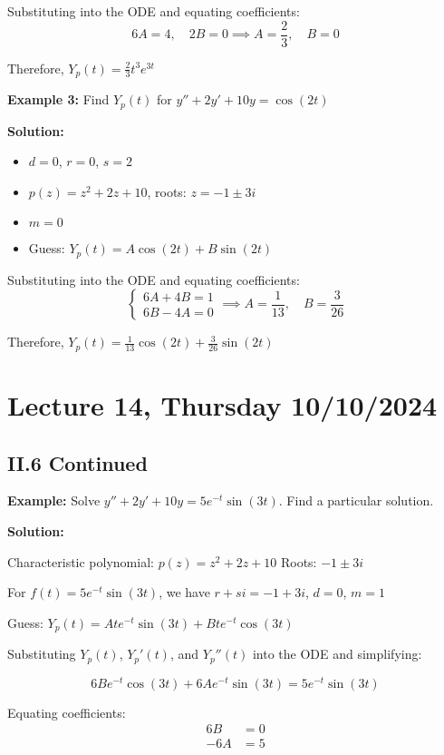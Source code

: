 \documentclass{article}
\begin{document}
Substituting into the ODE and equating coefficients:
\[
6A = 4, \quad 2B = 0 \implies A = \frac{2}{3}, \quad B = 0
\]

Therefore, $Y_p(t) = \frac{2}{3}t^3e^{3t}$

\textbf{Example 3:} Find $Y_p(t)$ for $y'' + 2y' + 10y = \cos(2t)$

\textbf{Solution:}
\begin{itemize}
    \item $d = 0$, $r = 0$, $s = 2$
    \item $p(z) = z^2 + 2z + 10$, roots: $z = -1 \pm 3i$
    \item $m = 0$
    \item Guess: $Y_p(t) = A \cos(2t) + B \sin(2t)$
\end{itemize}

Substituting into the ODE and equating coefficients:
\[
\begin{cases}
6A + 4B = 1 \\
6B - 4A = 0
\end{cases}
\implies A = \frac{1}{13}, \quad B = \frac{3}{26}
\]

Therefore, $Y_p(t) = \frac{1}{13} \cos(2t) + \frac{3}{26} \sin(2t)$

\section*{Lecture 14, Thursday 10/10/2024}

\subsection*{II.6 Continued}

\textbf{Example:} Solve $y''+2y'+10y = 5e^{-t}\sin(3t)$. Find a particular solution.

\textbf{Solution:}

Characteristic polynomial: $p(z) = z^2+2z+10$
Roots: $-1 \pm 3i$

For $f(t) = 5e^{-t}\sin(3t)$, we have $r + si = -1 + 3i$, $d = 0$, $m = 1$

Guess: $Y_p(t) = At e^{-t}\sin(3t) + Bt e^{-t}\cos(3t)$

Substituting $Y_p(t)$, $Y_p'(t)$, and $Y_p''(t)$ into the ODE and simplifying:

\[6Be^{-t}\cos(3t) + 6Ae^{-t}\sin(3t) = 5e^{-t}\sin(3t)\]

Equating coefficients:
\begin{align*}
6B &= 0 \\
-6A &= 5
\end{align*}
\end{document}
